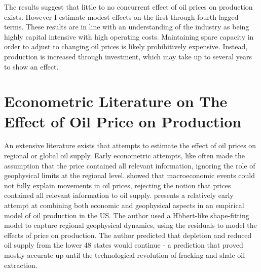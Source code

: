 \documentclass[12pt]{article}
\begin{document}
The results suggest that little to no concurrent effect of oil prices on production exists.  However I estimate modest effects on the first through fourth lagged terms. These results are in line with an understanding of the industry as being highly capital intensive with high operating costs.  Maintaining spare capacity in order to adjust to changing oil prices is likely prohibitively expensive.  Instead, production is increased through investment, which may take up to several years to show an effect.

\section{Econometric Literature on The Effect of Oil Price on Production}


An extensive literature exists that attempts to estimate the effect of oil prices on regional or global oil supply. Early econometric attempts, like \citet{adelman_fea_1975} often made the assumption that the price contained all relevant information, ignoring the role of geophysical limits at the regional level. \citet{hamilton_oil_1983} showed that macroeconomic events could not fully explain movements in oil prices, rejecting the notion that prices contained all relevant information to oil supply. \citet{kaufmann_oil_1991} presents a relatively early attempt at combining both economic and geophysical aspects in an empirical model of oil production in the US. The author used a Hbbert-like \citep{hubbert_energy_1962} shape-fitting model to capture regional geophysical dynamics, using the residuals to model the effects of price on production. The author predicted that depletion and reduced oil supply from the lower 48 states would continue - a prediction that proved mostly accurate up until the technological revolution of fracking and shale oil extraction. 
\end{document}
